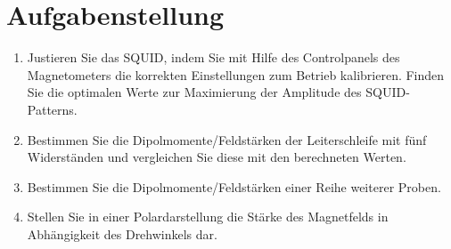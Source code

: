 \section{Aufgabenstellung}

\begin{enumerate}

\item Justieren Sie das SQUID, indem Sie mit Hilfe des Controlpanels des Magnetometers die korrekten Einstellungen zum Betrieb kalibrieren. Finden Sie die optimalen Werte zur Maximierung der Amplitude des SQUID-Patterns.

\item Bestimmen Sie die Dipolmomente/Feldstärken der Leiterschleife mit fünf Widerständen und vergleichen Sie diese mit den berechneten Werten.

\item Bestimmen Sie die Dipolmomente/Feldstärken einer Reihe weiterer Proben.

\item Stellen Sie in einer Polardarstellung die Stärke des Magnetfelds in Abhängigkeit des Drehwinkels dar.

\end{enumerate}